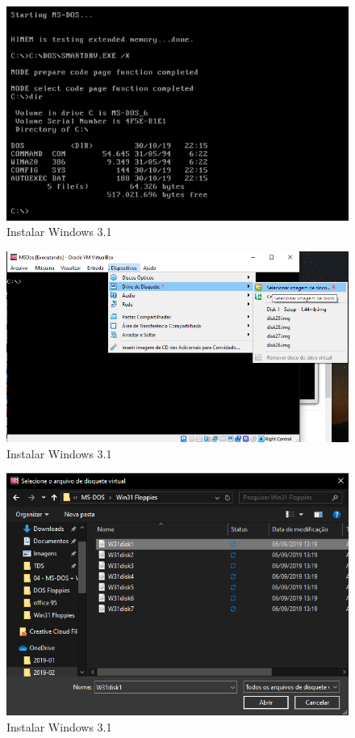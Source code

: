 \documentclass{report}
\begin{document}
\begin{figure}
\centering
\includegraphics[width=\textwidth]{Screenshot_21.png}
\caption{Instalar Windows 3.1}
\label{fig:21}
\end{figure}

\begin{figure}
\centering
\includegraphics[width=\textwidth]{Screenshot_22.png}
\caption{Instalar Windows 3.1}
\label{fig:22}
\end{figure}

\begin{figure}
\centering
\includegraphics[width=\textwidth]{Screenshot_23.png}
\caption{Instalar Windows 3.1}
\label{fig:23}
\end{figure}
\end{document}
